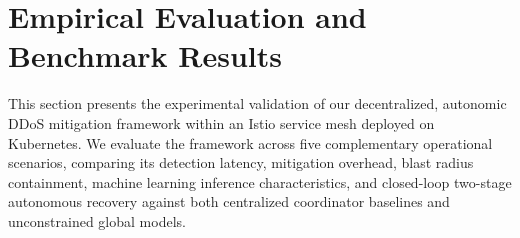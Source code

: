 
\section{Empirical Evaluation and Benchmark Results}
\label{sec:evaluation}

This section presents the experimental validation of our decentralized, autonomic DDoS mitigation framework within an Istio service mesh deployed on Kubernetes. We evaluate the framework across five complementary operational scenarios, comparing its detection latency, mitigation overhead, blast radius containment, machine learning inference characteristics, and closed-loop two-stage autonomous recovery against both centralized coordinator baselines and unconstrained global models.








